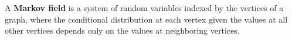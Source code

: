 A \textbf{Markov field} is a system of random variables indexed by the vertices of a graph, where the conditional distribution at each vertex given the values at all other vertices depends only on the values at neighboring vertices.